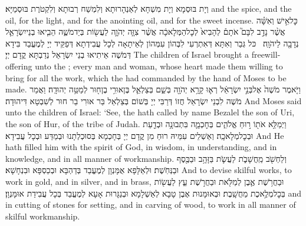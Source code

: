 {וְיָת בּוּסְמָא וְיָת מִשְׁחָא לְאַנְהָרוּתָא וְלִמְשַׁח רְבוּתָא וְלִקְטֹרֶת בּוּסְמַיָּא׃}
{and the spice, and the oil, for the light, and for the anointing oil, and for the sweet incense.}{}
{כׇּל\maqqaf אִ֣ישׁ וְאִשָּׁ֗ה אֲשֶׁ֨ר נָדַ֣ב לִבָּם֮ אֹתָם֒ לְהָבִיא֙ לְכׇל\maqqaf הַמְּלָאכָ֔ה אֲשֶׁ֨ר צִוָּ֧ה יְהֹוָ֛ה לַעֲשׂ֖וֹת בְּיַד\maqqaf מֹשֶׁ֑ה הֵבִ֧יאוּ בְנֵי\maqqaf יִשְׂרָאֵ֛ל נְדָבָ֖ה לַיהֹוָֽה׃ \petucha }
{כּל גְּבַר וְאִתָּא דְּאִתְרְעִי לִבְּהוֹן עִמְּהוֹן לְאֵיתָאָה לְכָל עֲבִידְתָא דְּפַקֵּיד יְיָ לְמֶעֱבַד בִּידָא דְּמֹשֶׁה אֵיתִיאוּ בְנֵי יִשְׂרָאֵל נְדַבְתָּא קֳדָם יְיָ׃}
{The children of Israel brought a freewill-offering unto the \lord; every man and woman, whose heart made them willing to bring for all the work, which the \lord\space had commanded by the hand of Moses to be made.}{}
{וַיֹּ֤אמֶר מֹשֶׁה֙ אֶל\maqqaf בְּנֵ֣י יִשְׂרָאֵ֔ל רְא֛וּ קָרָ֥א יְהֹוָ֖ה בְּשֵׁ֑ם בְּצַלְאֵ֛ל בֶּן\maqqaf אוּרִ֥י בֶן\maqqaf ח֖וּר לְמַטֵּ֥ה יְהוּדָֽה׃}
{וַאֲמַר מֹשֶׁה לִבְנֵי יִשְׂרָאֵל חֲזוֹ דְּרַבִּי יְיָ בְּשׁוֹם בְּצַלְאֵל בַּר אוּרִי בַר חוּר לְשִׁבְטָא דִּיהוּדָה׃}
{And Moses said unto the children of Israel: ‘See, the \lord\space hath called by name Bezalel the son of Uri, the son of Hur, of the tribe of Judah.}{}
{וַיְמַלֵּ֥א אֹת֖וֹ ר֣וּחַ אֱלֹהִ֑ים בְּחׇכְמָ֛ה בִּתְבוּנָ֥ה וּבְדַ֖עַת וּבְכׇל\maqqaf מְלָאכָֽה׃}
{וְאַשְׁלֵים עִמֵּיהּ רוּחַ מִן קֳדָם יְיָ בְּחָכְמָא בְּסוּכְלְתָנוּ וּבְמַדַּע וּבְכָל עֲבִידָא׃}
{And He hath filled him with the spirit of God, in wisdom, in understanding, and in knowledge, and in all manner of workmanship.}{}
{וְלַחְשֹׁ֖ב מַֽחֲשָׁבֹ֑ת לַעֲשֹׂ֛ת בַּזָּהָ֥ב וּבַכֶּ֖סֶף וּבַנְּחֹֽשֶׁת׃}
{וּלְאַלָּפָא אֻמָּנְוָן לְמֶעֱבַד בְּדַהְבָּא וּבְכַסְפָּא וּבִנְחָשָׁא׃}
{And to devise skilful works, to work in gold, and in silver, and in brass,}{}
{וּבַחֲרֹ֥שֶׁת אֶ֛בֶן לְמַלֹּ֖את וּבַחֲרֹ֣שֶׁת עֵ֑ץ לַעֲשׂ֖וֹת בְּכׇל\maqqaf מְלֶ֥אכֶת מַחֲשָֽׁבֶת׃}
{וּבְאוּמָּנוּת אֶבֶן טָבָא לְאַשְׁלָמָא וּבְנַגָּרוּת אָעָא לְמֶעֱבַד בְּכָל עֲבִידַת אוּמָּנְוָן׃}
{and in cutting of stones for setting, and in carving of wood, to work in all manner of skilful workmanship.}{}
